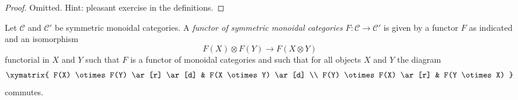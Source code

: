\begin{proof}
Omitted. Hint: pleasant exercise in the definitions.
\end{proof}

\begin{definition}
\label{definition-functor-symmetric-monoidal-categories}
Let $\mathcal{C}$ and $\mathcal{C}'$ be symmetric monoidal categories.
A {\it functor of symmetric monoidal categories}
$F : \mathcal{C} \to \mathcal{C}'$
is given by a functor $F$ as indicated and an isomorphism
$$
F(X) \otimes F(Y) \to F(X \otimes Y)
$$
functorial in $X$ and $Y$
such that $F$ is a functor of monoidal categories and such that
for all objects $X$ and $Y$ the diagram
$$
\xymatrix{
F(X) \otimes F(Y) \ar[r] \ar[d] &
F(X \otimes Y) \ar[d] \\
F(Y) \otimes F(X) \ar[r] &
F(Y \otimes X)
}
$$
commutes.
\end{definition}

